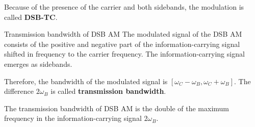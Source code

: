 \begin{refsection}
Because of the presence of the carrier and both sidebands, the modulation is called  \textbf{\acf{DSB-TC}}.

\begin{definition}{Transmission bandwidth of \acs{DSB} \acs{AM}}
	The modulated signal of the \acs{DSB} \acs{AM} consists of the positive and negative part of the information-carrying signal shifted in frequency to the carrier frequency. The information-carrying signal emerges as sidebands.
	
	Therefore, the bandwidth of the modulated signal is $[\omega_C - \omega_B, \omega_C + \omega_B]$. The difference $2 \omega_B$ is called  \textbf{transmission bandwidth}.
\end{definition}

\begin{fact}
	The transmission bandwidth of \acs{DSB} \acs{AM} is the double of the maximum frequency in the information-carrying signal $2 \omega_B$.
\end{fact}

\begin{figure}[H]
	

\end{figure}
\end{refsection}
